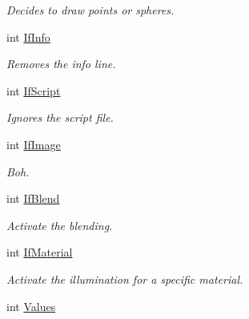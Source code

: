 \begin{DoxyCompactItemize}
\begin{DoxyCompactList}\small\item\em \-Decides to draw points or spheres. \end{DoxyCompactList}\item 
\hypertarget{classDraw_a068515d973f897b4d629594f8a30aa3a}{int \hyperlink{classDraw_a068515d973f897b4d629594f8a30aa3a}{\-If\-Info}}\label{classDraw_a068515d973f897b4d629594f8a30aa3a}

\begin{DoxyCompactList}\small\item\em \-Removes the info line. \end{DoxyCompactList}\item 
\hypertarget{classDraw_af08a6e98855e453a79f375df01cf15c4}{int \hyperlink{classDraw_af08a6e98855e453a79f375df01cf15c4}{\-If\-Script}}\label{classDraw_af08a6e98855e453a79f375df01cf15c4}

\begin{DoxyCompactList}\small\item\em \-Ignores the script file. \end{DoxyCompactList}\item 
\hypertarget{classDraw_ab7c162bdd1aa006017f7e85f0b68ad22}{int \hyperlink{classDraw_ab7c162bdd1aa006017f7e85f0b68ad22}{\-If\-Image}}\label{classDraw_ab7c162bdd1aa006017f7e85f0b68ad22}

\begin{DoxyCompactList}\small\item\em \-Boh. \end{DoxyCompactList}\item 
\hypertarget{classDraw_a03b1ef931447021cebcff5286c6a3783}{int \hyperlink{classDraw_a03b1ef931447021cebcff5286c6a3783}{\-If\-Blend}}\label{classDraw_a03b1ef931447021cebcff5286c6a3783}

\begin{DoxyCompactList}\small\item\em \-Activate the blending. \end{DoxyCompactList}\item 
\hypertarget{classDraw_a2e742183addcbbee8c3d478448355b43}{int \hyperlink{classDraw_a2e742183addcbbee8c3d478448355b43}{\-If\-Material}}\label{classDraw_a2e742183addcbbee8c3d478448355b43}

\begin{DoxyCompactList}\small\item\em \-Activate the illumination for a specific material. \end{DoxyCompactList}\item 
\hypertarget{classDraw_adf7d4e65efeb69a8ebbbb3cabbc39eae}{int \hyperlink{classDraw_adf7d4e65efeb69a8ebbbb3cabbc39eae}{\-Values}}\label{classDraw_adf7d4e65efeb69a8ebbbb3cabbc39eae}


\end{DoxyCompactItemize}
